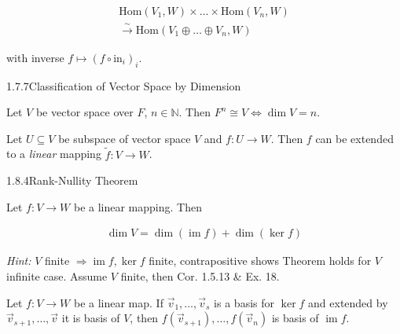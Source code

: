 \documentclass[10pt]{article} %
\DeclareMathOperator{\im}{im}
\newcommand{\Hint}{\vspace{0.2em}\textit{Hint: }}
\begin{document}
\begin{multicols}{3}
\begin{exercise}{12}{}
        \begin{align*}
            \mathrm{Hom}(V_1,W) \times \hdots \times \mathrm{Hom}(V_n,W) \\ \xrightarrow{\sim} \mathrm{Hom}(V_1 \oplus \hdots \oplus V_n,W)
        \end{align*}

    with inverse $f \mapsto (f \circ \mathrm{in}_i)_i$.

\end{exercise}

\begin{theorem}{1.7.7}{Classification of Vector Space by Dimension}

    Let $V$ be vector space over $F$, $n \in \mathbb{N}$. Then $F^n \cong V \Leftrightarrow \dim{V} = n$.

\end{theorem}

\begin{exercise}{17}{}

    Let $U \subseteq V$ be subspace of vector space $V$ and $f: U \to W$. Then $f$ can be extended to a \emph{linear} mapping $\tilde{f}: V \to W$.

\end{exercise}

\begin{theorem}{1.8.4}{Rank-Nullity Theorem}

    Let $f: V \to W$ be a linear mapping. Then

        \begin{align*}
            \dim{V} = \dim{(\im{f})} + \dim{(\ker{f})}
        \end{align*}

    \Hint $V$ finite $\Rightarrow \im{f},\ker{f}$ finite, contrapositive shows Theorem holds for $V$ infinite case. Assume $V$ finite, then Cor. 1.5.13 \& Ex. 18.

\end{theorem}

\begin{exercise}{18}{}

    Let $f: V \to W$ be a linear map. If $\vec{v}_1, \hdots, \vec{v}_s$ is a basis for $\ker{f}$ and extended by $\vec{v}_{s+1}, \hdots, \vec{v}$ it is basis of $V$, then $f(\vec{v}_{s+1}),\hdots,f(\vec{v}_n)$ is basis of $\im{f}$.


\end{exercise}
\end{multicols}
\end{document}
